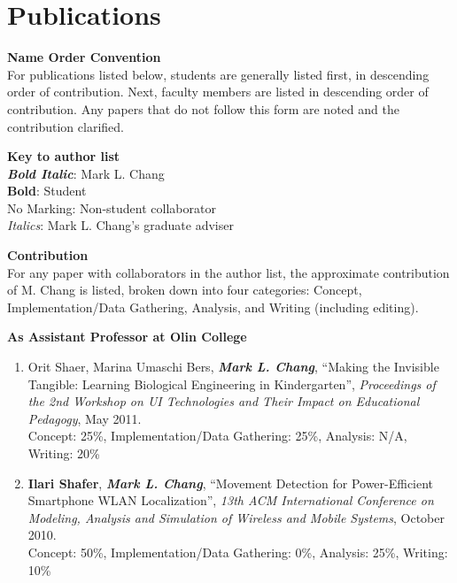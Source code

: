 \documentclass[line]{res}
\begin{document}
\begin{resume}
\begin{longtable}
		\hline 
	\end{longtable}
	
	\section{\sc Publications}
	
	\textbf{Name Order Convention}\\
	For publications listed below, students are generally listed first, in descending order of contribution. Next, faculty members are listed in descending order of contribution. Any papers that do not follow this form are noted and the contribution clarified.
	
	\textbf{Key to author list}\\
	\textbf{\textit{Bold Italic}}: Mark L. Chang\\
	\textbf{Bold}: Student\\
	No Marking: Non-student collaborator\\
	\textit{Italics}: Mark L. Chang's graduate adviser
	
	\textbf{Contribution}\\
	For any paper with collaborators in the author list, the approximate contribution of M. Chang is listed, broken down into four categories: Concept, Implementation/Data Gathering, Analysis, and Writing (including editing).
	
	\textbf{As Assistant Professor at Olin College}
	\begin{enumerate}
		
		\item Orit Shaer, Marina Umaschi Bers, \textbf{\textit{Mark L. Chang}}, ``Making the Invisible Tangible: Learning Biological Engineering in Kindergarten'', \textit{Proceedings of the 2nd Workshop on UI Technologies and Their Impact on Educational Pedagogy}, May 2011.\\
		Concept: 25\%, Implementation/Data Gathering: 25\%, Analysis: N/A, Writing: 20\%
		
		\item \textbf{Ilari Shafer}, \textbf{\textit{Mark L. Chang}}, ``Movement Detection for Power-Efficient Smartphone WLAN Localization'', \textit{13th ACM International Conference on Modeling, Analysis and Simulation of Wireless and Mobile Systems}, October 2010.\\
		Concept: 50\%, Implementation/Data Gathering: 0\%, Analysis: 25\%, Writing: 10\%
		

\end{enumerate}
\end{resume}
\end{document}
